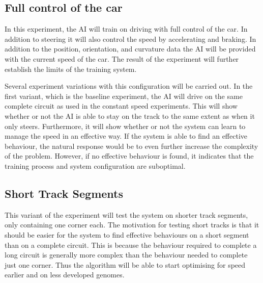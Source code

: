 

\subsection{Full control of the car}
\label{method:baseline}
In this experiment, the AI will train on driving with full control of the car. In addition to steering it will also control the speed by accelerating and braking. In addition to the position, orientation, and curvature data the AI will be provided with the current speed of the car. The result of the experiment will further establish the limits of the training system. 

Several experiment variations with this configuration will be carried out. In the first variant, which is the baseline experiment, the AI will drive on the same complete circuit as used in the constant speed experiments. This will show whether or not the AI is able to stay on the track to the same extent as when it only steers. Furthermore, it will show whether or not the system can learn to manage the speed in an effective way. If the system is able to find an effective behaviour, the natural response would be to even further increase the complexity of the problem. However, if no effective behaviour is found, it indicates that the training process and system configuration are suboptimal. 

\subsection{Short Track Segments}
\label{subsec:shorttracksegment}
This variant of the experiment will test the system on shorter track segments, only containing one corner each. The motivation for testing short tracks is that it should be easier for the system to find effective behaviours on a short segment than on a complete circuit. This is because the behaviour required to complete a long circuit is generally more complex than the behaviour needed to complete just one corner. Thus the algorithm will be able to start optimising for speed earlier and on less developed genomes. 

